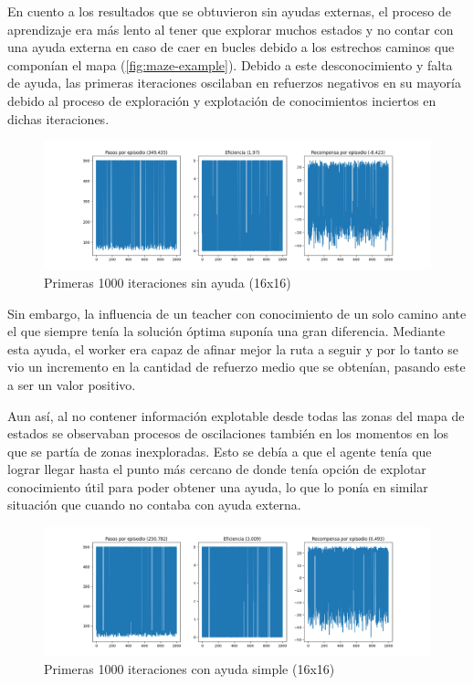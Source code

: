 \documentclass[letterpaper]{article} %
\begin{document}
En cuento a los resultados que se obtuvieron sin ayudas externas, el proceso de aprendizaje era más lento al tener que explorar muchos estados y
 no contar con una ayuda externa en caso de caer en bucles debido a los estrechos caminos que componían el mapa (\ref{fig:maze-example}). Debido
  a este desconocimiento y falta de ayuda, las primeras iteraciones oscilaban en refuerzos negativos en su mayoría debido al proceso de exploración
   y explotación de conocimientos inciertos en dichas iteraciones. 

\begin{figure}[H]
    \centering
    \includegraphics[width=0.9\columnwidth]{sin_ayuda_externa.png}
    \caption{Primeras 1000 iteraciones sin ayuda (16x16)\label{fig:FuN1}}
\end{figure}

Sin embargo, la influencia de un teacher con conocimiento de un solo camino ante el que siempre tenía la solución óptima suponía una gran diferencia.
 Mediante esta ayuda, el worker era capaz de afinar mejor la ruta a seguir y por lo tanto se vio un incremento en la cantidad de refuerzo medio que 
 se obtenían, pasando este a ser un valor positivo.

Aun así, al no contener información explotable desde todas las zonas del mapa de estados se observaban procesos de oscilaciones también en los momentos
 en los que se partía de zonas inexploradas. Esto se debía a que el agente tenía que lograr llegar hasta el punto más cercano de donde tenía opción 
 de explotar conocimiento útil para poder obtener una ayuda, lo que lo ponía en similar situación que cuando no contaba con ayuda externa.

\begin{figure}[H]
    \centering
    \includegraphics[width=0.9\columnwidth]{ayuda_externa_1path.png}
    \caption{Primeras 1000 iteraciones con ayuda simple (16x16)\label{fig:FuN2}}
    
\end{figure}
\end{document}
